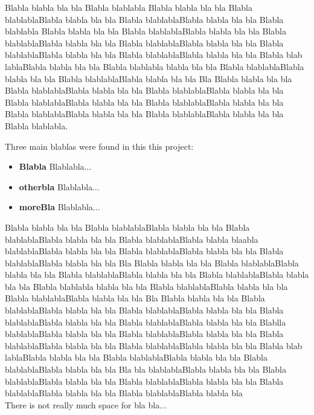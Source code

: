 \documentclass[a4paper,oneside]{report}
\begin{document}
\begin{multicols}{2}
Blabla blabla bla bla Blabla blablabla  Blabla blabla bla bla Blabla blablablaBlabla blabla bla bla Blabla blablablaBlabla blabla bla bla Blabla blablabla Blabla blabla bla bla Blabla blablablaBlabla blabla bla bla Blabla blablablaBlabla blabla bla bla Blabla blablablaBlabla blabla bla bla Blabla blablablaBlabla blabla bla bla Blabla blablablaBlabla blabla bla bla Blabla blab lablaBlabla blabla bla bla Blabla blablabla blabla bla bla Blabla blablablaBlabla blabla bla bla Blabla blablablaBlabla blabla bla bla Bla
Blabla blabla bla bla Blabla blablablaBlabla blabla bla bla Blabla blablablaBlabla blabla bla bla Blabla blablablaBlabla blabla bla bla Blabla blablablaBlabla blabla bla bla Blabla blablablaBlabla blabla bla bla Blabla blablablaBlabla blabla bla bla Blabla blablabla.

Three main blablas were found in this this project:
\begin{itemize}
\item {\bf Blabla} Blablabla...

\item {\bf otherbla} Blablabla...

\item {\bf moreBla} Blablabla...

\end{itemize}

Blabla blabla bla bla Blabla blablablaBlabla blabla bla bla Blabla blablablaBlabla blabla bla bla Blabla blablablaBlabla blabla blaabla blablablaBlabla blabla bla bla Blabla blablablaBlabla blabla bla bla Blabla blablablaBlabla blabla bla bla Bla
Blabla blabla bla bla Blabla blablablaBlabla blabla bla bla Blabla blablablaBlabla blabla bla bla Blabla blablablaBlabla blabla bla bla Blabla blablabla blabla bla bla Blabla blablablaBlabla blabla bla bla Blabla blablablaBlabla blabla bla bla Bla
Blabla blabla bla bla Blabla blablablaBlabla blabla bla bla Blabla blablablaBlabla blabla bla bla Blabla blablablaBlabla blabla bla bla Blabla blablablaBlabla blabla bla bla Blablla blablablaBlabla blabla bla bla Blabla blablablaBlabla blabla bla bla Blabla blablablaBlabla blabla bla bla Blabla blablablaBlabla blabla bla bla Blabla blab lablaBlabla blabla bla bla Blabla blablablaBlabla blabla bla bla Blabla blablablaBlabla blabla bla bla Bla bla blablablaBlabla blabla bla bla Blabla blablablaBlabla blabla bla bla Blabla blablablaBlabla blabla bla bla Blabla blablablaBlabla blabla bla bla Blabla blablablaBlabla blabla bla \\There is not really much space for bla bla...


\end{multicols}
\end{document}
